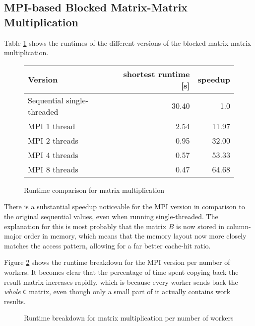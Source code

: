 \documentclass[]{article}
\begin{document}
\subsection{MPI-based Blocked Matrix-Matrix Multiplication}

 Table \ref{tab:matrix-mult-runtime} shows the runtimes of the different versions of the blocked matrix-matrix multiplication.

\begin{figure}[h]
	\centering
	\begin{tabular}{|l|r|r|}
		\hline
		\textbf{Version} & \textbf{shortest runtime [s]} & \textbf{speedup} \\
		\hline
		Sequential single-threaded	& 30.40	& 1.0 \\ 
		\hline 
		MPI 1 thread				& 2.54	& 11.97 \\ 
		\hline 
		MPI 2 threads				& 0.95	& 32.00 \\ 
		\hline 
		MPI 4 threads				& 0.57	& 53.33 \\ 
		\hline 
		MPI 8 threads				& 0.47	& 64.68 \\ 
		\hline 
	\end{tabular} 
	\caption{Runtime comparison for matrix multiplication}
	\label{tab:matrix-mult-runtime}
\end{figure}

There is a substantial speedup noticeable for the MPI version in comparison to the original sequential values, even when running single-threaded. The explanation for this is most probably that the matrix $B$ is now stored in column-major order in memory, which means that the memory layout now more closely matches the access pattern, allowing for a far better cache-hit ratio.

Figure \ref{fig:maxtrix-mult-chart} shows the runtime breakdown for the MPI version per number of workers. It becomes clear that the percentage of time spent copying back the result matrix increases rapidly, which is because every worker sends back the \emph{whole} \texttt{C} matrix, even though only a small part of it actually contains work results.

\begin{figure}[h]
	\centering
	\caption{Runtime breakdown for matrix multiplication per number of workers}
	\label{fig:maxtrix-mult-chart}
\end{figure}
\end{document}
